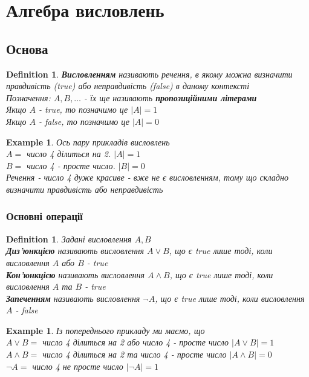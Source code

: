 \documentclass[a4paper, 14pt]{extarticle}
\theoremstyle{theoremdd}
\theoremstyle{theoremdd}
\newtheorem{definition}[theorem]{Definition}
\theoremstyle{theoremdd}
\theoremstyle{theoremdd}
\newtheorem{example}[theorem]{Example}
\theoremstyle{theoremdd}
\theoremstyle{theoremdd}
\theoremstyle{theoremdd}
\theoremstyle{theoremdd}
\begin{document}
\tableofcontents
\newpage

\section{Алгебра висловлень}
\subsection{Основа}
\begin{definition}
\textbf{Висловленням} називають речення, в якому можна визначити правдивість (true) або неправдивість (false) в даному контексті\\
Позначення: $A,B,\dots$ - їх ще 
називають \textbf{пропозиційними літерами}
\bigskip
\\
Якщо $A$ - true, то позначимо це $|A| = 1$\\
Якщо $A$ - false, то позначимо це $|A| = 0$\\
\end{definition}

\begin{example} Ось пару прикладів висловлень\\
$A = $ число 4 ділиться на 2. $|A|=1$\\
$B = $ число 4 - просте число. $|B|=0$
\bigskip
\\
Речення - число 4 дуже красиве - вже не є висловленням, тому що складно визначити правдивість або неправдивість
\end{example}

\subsubsection*{Основні операції}
\begin{definition}
Задані висловлення $A,B$\\
\textbf{Диз'юнкцією} називають висловлення $A \vee B$, що є true лише тоді, коли висловлення $A$ або $B$ - true\\
\textbf{Кон'юнкцією} називають висловлення $A \wedge B$, що є true лише тоді, коли висловлення $A$ та $B$ - true\\
\textbf{Запеченням} називають висловлення $\neg A$, що є true лише тоді, коли висловлення $A$ - false
\end{definition}

\begin{example} Із попереднього прикладу ми маємо, що\\
$A \vee B =$ число 4 ділиться на 2 або число 4 - просте число \hspace{0.5cm} $|A \vee B| = 1$\\
$A \wedge B = $ число 4 ділиться на 2 та число 4 - просте число \hspace{0.6cm} $|A \wedge B| = 0$\\
$\neg A =$ число 4 не просте число \hspace{6.4cm} $|\neg A| = 1$
\end{example}
\end{document}

